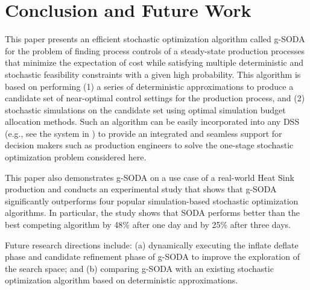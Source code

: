 \documentclass[a4paper, 12pt]{article} %
\begin{document}
\section{Conclusion and Future Work}
\label{sec:conclusion}

This paper presents an efficient stochastic optimization algorithm called g-SODA for the problem of finding process controls of a steady-state production processes that minimize the expectation of cost while satisfying multiple deterministic and stochastic feasibility constraints with a given high probability. 
This algorithm is based on performing (1) a series of deterministic approximations to produce a candidate set of near-optimal control settings for the production process, and (2) stochastic simulations on the candidate set using optimal simulation budget allocation methods.  
Such an algorithm can be easily incorporated into any DSS (e.g., see the system in \cite{Brodsky2017ieeebd}) to provide an integrated and seamless support for decision makers such as production engineers to solve the one-stage stochastic optimization problem considered here.

This paper also demonstrates g-SODA on a use case of a real-world Heat Sink production and  conducts an experimental study that shows that g-SODA significantly outperforms four popular simulation-based stochastic optimization algorithms. In particular, the study shows that SODA performs better than the best competing algorithm by 48\% after one day and by 25\% after three days.

Future research directions include: (a) dynamically executing the inflate deflate phase and candidate refinement phase of g-SODA to improve the exploration of the search space; and (b) comparing g-SODA with an existing stochastic optimization algorithm based on deterministic approximations.

 


\end{document}
